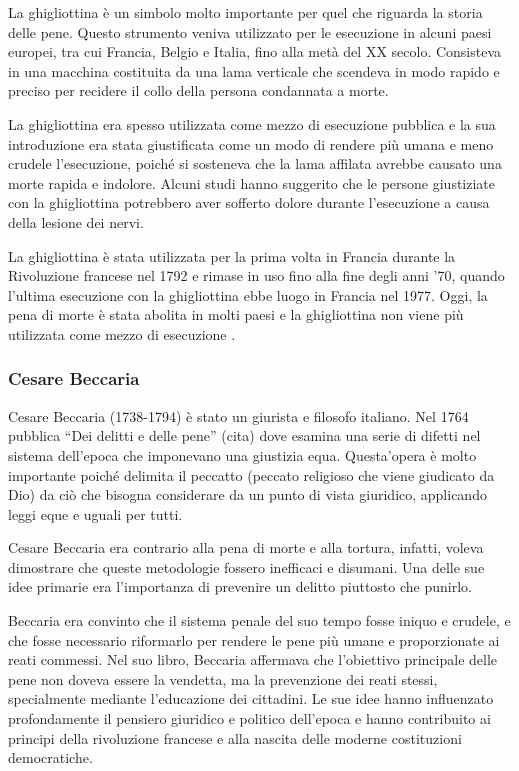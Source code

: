 \documentclass[a4paper, 12pt]{article}
\newcommand{\quotes}[1]{``#1''}
\begin{document}
La ghigliottina è un simbolo molto importante per quel che riguarda
la storia delle pene.
Questo strumento veniva utilizzato per le esecuzione in alcuni paesi europei,
tra cui Francia, Belgio e Italia, fino alla metà del XX secolo.
Consisteva in una macchina costituita da una lama
verticale che scendeva in modo rapido e preciso per recidere il
collo della persona condannata a morte.

La ghigliottina era spesso utilizzata come mezzo di esecuzione pubblica
e la sua introduzione era stata giustificata come un modo di rendere più umana
e meno crudele l'esecuzione, poiché si sosteneva che la lama affilata
avrebbe causato una morte rapida e indolore.
Alcuni studi hanno suggerito che le persone giustiziate con la
ghigliottina potrebbero aver sofferto dolore durante l'esecuzione
a causa della lesione dei nervi.

La ghigliottina è stata utilizzata per la prima volta in Francia durante la Rivoluzione francese
nel 1792 e rimase in uso fino alla fine degli anni '70,
quando l'ultima esecuzione con la ghigliottina ebbe luogo in Francia nel 1977.
Oggi, la pena di morte è stata abolita in molti paesi e la ghigliottina non viene più
utilizzata come mezzo di esecuzione \cite{ghigliottina}.

\subsubsection{Cesare Beccaria}

Cesare Beccaria (1738-1794) è stato un giurista e filosofo italiano.
Nel 1764 pubblica \quotes{Dei delitti e delle pene} (cita) 
dove esamina una serie di difetti nel sistema dell'epoca che imponevano una giustizia equa.
Questa'opera è molto importante poiché delimita il peccatto (peccato religioso
che viene giudicato da Dio) da ciò che bisogna considerare da un punto di vista giuridico,
applicando leggi eque e uguali per tutti.

Cesare Beccaria era contrario alla pena di morte e alla tortura, infatti,
voleva dimostrare che queste metodologie fossero inefficaci e disumani.
Una delle sue idee primarie era l'importanza di prevenire un delitto piuttosto che punirlo.

Beccaria era convinto che il sistema penale del suo tempo fosse iniquo e crudele,
e che fosse necessario riformarlo per rendere le pene più umane e proporzionate ai reati commessi.
Nel suo libro, Beccaria affermava che l'obiettivo principale delle pene non doveva essere la vendetta,
ma la prevenzione dei reati stessi, specialmente mediante l'educazione dei cittadini.
Le sue idee hanno influenzato profondamente il pensiero giuridico e politico dell'epoca
e hanno contribuito ai principi della rivoluzione francese e alla nascita delle moderne
costituzioni democratiche.
\end{document}
